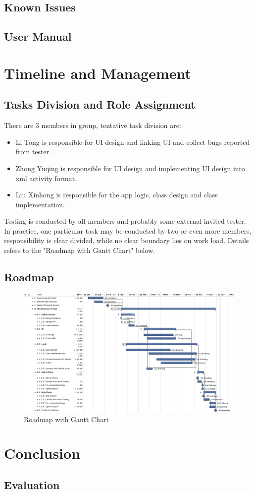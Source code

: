 \documentclass[10pt,a4paper,final,DIV=12]{scrartcl}
\begin{document}
\subsection{Known Issues}
	

\subsection{User Manual}
	

\section{Timeline and Management}
\subsection{Tasks Division and Role Assignment}
There are 3 members in group, tentative task division are: 
\begin{itemize}
\item Li Tong is responsible for UI design and linking UI and collect bugs reported from tester. 
\item Zhong Yuqing is responsible for UI design and implementing UI design into xml activity format. 
\item Liu Xinhong is responsible for the app logic, class design and class implementation. 
\end{itemize}
Testing is conducted by all members and probably some external invited tester.  
In practice, one particular task may be conducted by two or even more members, responsibility is clear divided, while no clear boundary lies on work load.  
Details refers to the "Roadmap with Gantt Chart" below. 
\subsection{Roadmap}
\begin{figure}[H]
\centering
\includegraphics[width=5.3in]{img/timetable.pdf}
\caption{Roadmap with Gantt Chart}
\end{figure}

\section{Conclusion}
\subsection{Evaluation}
	

\theendnotes
 
\end{document}
